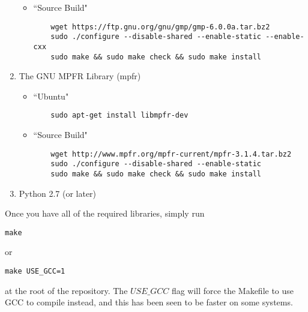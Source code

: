 \begin{enumerate}
\begin{itemize}
    \item ``Source Build"
    \begin{lstlisting}
    wget https://ftp.gnu.org/gnu/gmp/gmp-6.0.0a.tar.bz2
    sudo ./configure --disable-shared --enable-static --enable-cxx
    sudo make && sudo make check && sudo make install
    \end{lstlisting}
  \end{itemize}

  \item The GNU MPFR Library (mpfr)
  \begin{itemize}    
    \item ``Ubuntu"
    \begin{lstlisting}
    sudo apt-get install libmpfr-dev
    \end{lstlisting}

    \item ``Source Build"
    \begin{lstlisting}
    wget http://www.mpfr.org/mpfr-current/mpfr-3.1.4.tar.bz2
    sudo ./configure --disable-shared --enable-static
    sudo make && sudo make check && sudo make install
    \end{lstlisting}
  \end{itemize}

  \item Python 2.7 (or later)

\end{enumerate}

Once you have all of the required libraries, simply run 
\begin{lstlisting}
make
\end{lstlisting} 
or 
\begin{lstlisting}
make USE_GCC=1
\end{lstlisting} 
at the root of the repository. The $USE\_GCC$ flag will force the 
Makefile to use GCC to compile instead, and this has been seen to be faster 
on some systems.

